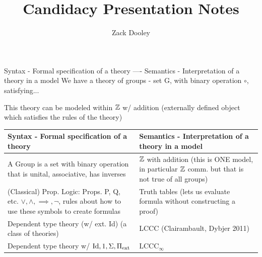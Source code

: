 \documentclass{article}
\title{Candidacy Presentation Notes}
\author{Zack Dooley}
\date{}
\begin{document}
\maketitle
Syntax - Formal specification of a theory ---- Semantics - Interpretation of a theory in a model
We have a theory of groups - set G, with binary operation $\circ$, satisfying...

This theory can be modeled within $\mathbb{Z}$ w/ addition (externally defined object which satisfies the rules of the theory)


\newpage
\begin{tabularx}{\columnwidth}{X|X}
    Syntax - Formal specification of a theory & Semantics - Interpretation of a theory in a model\\
    \hline
    A Group is a set with binary operation that is unital, associative, has inverses & $\mathbb{Z}$ with addition (this is ONE model, in particular $\mathbb{Z}$ comm. but that is not true of all groups)\\
    (Classical) Prop. Logic: Props. P, Q, etc. $\vee,\wedge,\implies,\neg$, rules about how to use these symbols to create formulas & Truth tables (lets us evaluate formula without constructing a proof)\\
    Dependent type theory (w/ ext. Id) (a class of theories) & LCCC (Clairambault, Dybjer 2011)\\
    Dependent type theory w/ $\operatorname{Id},1,\Sigma,\Pi_{\operatorname{ext}}$ & $\text{LCCC}_\infty$
\end{tabularx}
\end{document}

